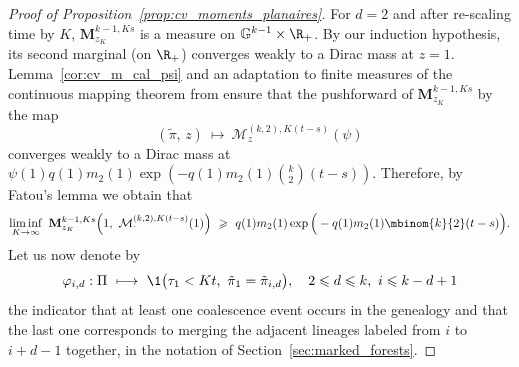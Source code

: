 \begin{refsegment}
\begin{proof}[Proof of Proposition~\ref{prop:cv_moments_planaires}]
For $d = 2$ and after re-scaling time by $K$, $\mathbf{M}^{k-1,Ks}_{z_K}$ is a measure on
$\mathbb{G}^{k-1} \times \R_+$. By our induction hypothesis, its second
marginal (on $\R_+$) converges weakly to a Dirac mass at $z=1$.
Lemma~\ref{cor:cv_m_cal_psi} and an adaptation to finite measures of
the continuous mapping theorem from \citet*[Theorem
5.27]{kallenberg_foundations_2021} ensure that the pushforward of
$\mathbf{M}^{k-1,Ks}_{z_K}$ by the map 
\[
    (\tilde\pi,\, z)\ \longmapsto\ \mathcal{M}_z^{(k,2),K(t-s)}(\psi)
\]
converges weakly to a Dirac mass at $\psi(1)q(1)m_2(1) \exp(
-q(1)m_2(1)\binom{k}{2}(t-s))$. Therefore, by Fatou's lemma we obtain that
\begin{equation} \label{eq:fatou_1}
    \liminf_{K\to\infty}\ \mathbf{M}^{k-1,Ks}_{z_K}\Big(
    1,\ \mathcal{M}^{(k,2),K(t-s)}_{\cdot}(1)\Big) 
    \ \geqslant\ 
    q(1)m_2(1)\exp\Big(-q(1)m_2(1)\mbinom{k}{2}(t-s)\Big).
\end{equation}
Let us now denote by 
\[ 
    \varphi_{i,d} : \Pi\ \longmapsto\ \1\big(\tau_1<Kt,\ \tilde\pi_1=
    \tilde\pi_{i,d}\big),\quad 2\leqslant d\leqslant k,\ i\leqslant  k-d+1
\]
the indicator that at least one coalescence event occurs in the genealogy
and that the last one corresponds to merging the adjacent lineages
labeled from $i$ to $i+d-1$ together, in the notation of
Section~\ref{sec:marked_forests}. 


\end{proof}
\end{refsegment}
